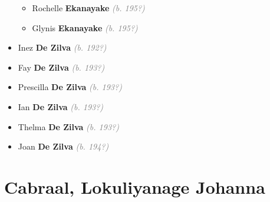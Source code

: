 \documentclass[10pt, openany]{book}
\begin{document}
\begin{itemize}
{\begin{itemize}
{\begin{itemize}
\item{Rochelle \textbf{Ekanayake} \textcolor{gray}{\textit{(b. 195?)}}
 }
\item{Glynis \textbf{Ekanayake} \textcolor{gray}{\textit{(b. 195?)}}
 }
\end{itemize}}
\end{itemize}
    }
\item{Inez \textbf{De Zilva} \textcolor{gray}{\textit{(b. 192?)}}
  }
\item{Fay \textbf{De Zilva} \textcolor{gray}{\textit{(b. 193?)}}
  }
\item{Prescilla \textbf{De Zilva} \textcolor{gray}{\textit{(b. 193?)}}
  }
\item{Ian \textbf{De Zilva} \textcolor{gray}{\textit{(b. 193?)}}
  }
\item{Thelma \textbf{De Zilva} \textcolor{gray}{\textit{(b. 193?)}}
  }
\item{Joan \textbf{De Zilva} \textcolor{gray}{\textit{(b. 194?)}}
  }
\end{itemize}
  
\part{Cabraal, Lokuliyanage Johanna}
\end{document}
